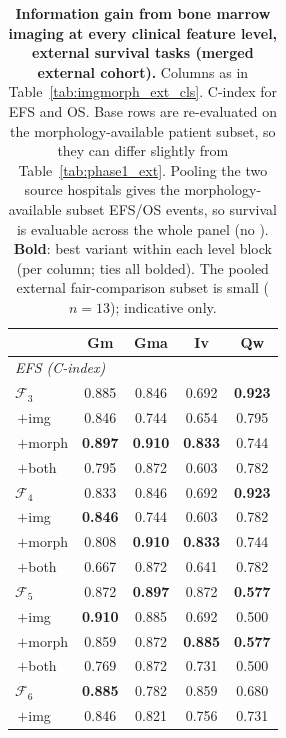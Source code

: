 \documentclass[pdflatex,sn-nature]{sn-jnl}
\begin{document}
\begin{table}[p]
\caption{\textbf{Information gain from bone marrow imaging at every
clinical feature level, external survival tasks (merged external
cohort).} Columns as in Table~\ref{tab:imgmorph_ext_cls}. C-index for
EFS and OS. Base rows are re-evaluated on the morphology-available
patient subset, so they can differ slightly from
Table~\ref{tab:phase1_ext}. Pooling the two source hospitals gives the
morphology-available subset EFS/OS events, so survival is evaluable
across the whole panel (no \textemdash). \textbf{Bold}: best variant
within each level block (per column; ties all bolded). The pooled
external fair-comparison subset is small ($n{=}13$); indicative only.}
\label{tab:imgmorph_ext_surv}
\centering
\scriptsize
\renewcommand{\arraystretch}{0.6}
\setlength{\tabcolsep}{28pt}
\begin{tabular}{@{}l cccc@{}}
\toprule
 & Gm & Gma & Iv & Qw \\
\midrule
\multicolumn{5}{l}{\textit{EFS (C-index)}} \\
$\mathcal{F}_3$      & 0.885 & 0.846 & 0.692 & \textbf{0.923} \\
\;\,$+$img           & 0.846 & 0.744 & 0.654 & 0.795 \\
\;\,$+$morph         & \textbf{0.897} & \textbf{0.910} & \textbf{0.833} & 0.744 \\
\;\,$+$both          & 0.795 & 0.872 & 0.603 & 0.782 \\
\addlinespace[2pt]
$\mathcal{F}_4$      & 0.833 & 0.846 & 0.692 & \textbf{0.923} \\
\;\,$+$img           & \textbf{0.846} & 0.744 & 0.603 & 0.782 \\
\;\,$+$morph         & 0.808 & \textbf{0.910} & \textbf{0.833} & 0.744 \\
\;\,$+$both          & 0.667 & 0.872 & 0.641 & 0.782 \\
\addlinespace[2pt]
$\mathcal{F}_5$      & 0.872 & \textbf{0.897} & 0.872 & \textbf{0.577} \\
\;\,$+$img           & \textbf{0.910} & 0.885 & 0.692 & 0.500 \\
\;\,$+$morph         & 0.859 & 0.872 & \textbf{0.885} & \textbf{0.577} \\
\;\,$+$both          & 0.769 & 0.872 & 0.731 & 0.500 \\
\addlinespace[2pt]
$\mathcal{F}_6$      & \textbf{0.885} & 0.782 & 0.859 & 0.680 \\
\;\,$+$img           & 0.846 & 0.821 & 0.756 & 0.731 \\

\end{tabular}
\end{table}
\end{document}
